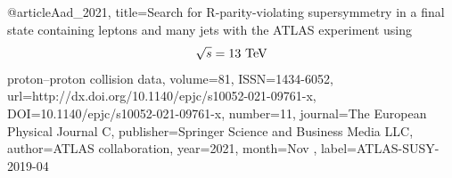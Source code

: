 @article{Aad_2021, 
    title={Search for R-parity-violating supersymmetry in a final state containing leptons and many jets with the ATLAS experiment using $$\sqrt{s} = 13\hbox { TeV}$$ proton–proton collision data}, 
    volume={81}, 
    ISSN={1434-6052}, 
    url={http://dx.doi.org/10.1140/epjc/s10052-021-09761-x}, 
    DOI={10.1140/epjc/s10052-021-09761-x}, 
    number={11}, 
    journal={The European Physical Journal C}, 
    publisher={Springer Science and Business Media LLC}, 
    author={ATLAS collaboration}, 
    year={2021}, 
    month=Nov ,
    label={ATLAS-SUSY-2019-04}
}

